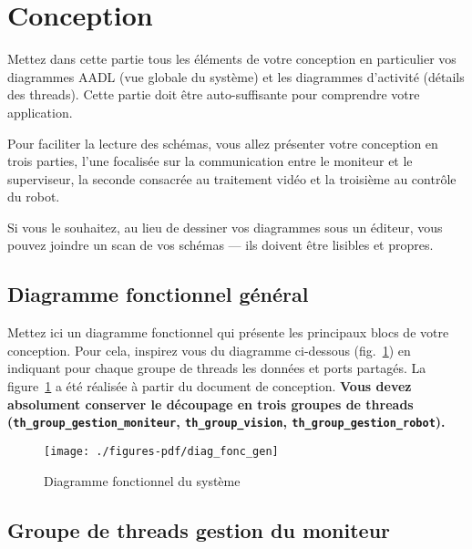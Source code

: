 \documentclass[11pt, a4paper]{paper}
\begin{document}
\newpage




\section{Conception}

{\color{red} Mettez dans cette partie tous les éléments de votre conception en particulier vos diagrammes AADL (vue globale du système) et les diagrammes d'activité (détails des threads). Cette partie doit être auto-suffisante pour comprendre votre application.

Pour faciliter la lecture des schémas, vous allez présenter votre conception en trois parties, l'une focalisée sur la communication entre le moniteur et le superviseur, la seconde consacrée au traitement vidéo et la troisième au contrôle du robot.

Si vous le souhaitez, au lieu de dessiner vos diagrammes sous un éditeur, vous pouvez joindre un scan de vos schémas — ils doivent être lisibles et propres.}

\subsection{Diagramme fonctionnel général}

{\color{red} Mettez ici un diagramme fonctionnel qui présente les principaux blocs de votre conception. Pour cela, inspirez vous du diagramme ci-dessous (fig.~\ref{fig:diag_fonc_gen}) en indiquant pour chaque groupe de threads les données et ports partagés. La figure~\ref{fig:diag_fonc_gen} a été réalisée à partir du document de conception. {\bf Vous devez absolument conserver le découpage en trois groupes de threads ({\tt th\_group\_gestion\_moniteur}, {\tt th\_group\_vision}, {\tt th\_group\_gestion\_robot}).}}

\begin{figure}[htbp]
\begin{center}
{\texttt{[image: ./figures-pdf/diag\_fonc\_gen]}}
{\caption{Diagramme fonctionnel du système}}
\end{center}
\label{fig:diag_fonc_gen}
\end{figure}
\FloatBarrier

\subsection{Groupe de threads gestion du moniteur}
\end{document}
